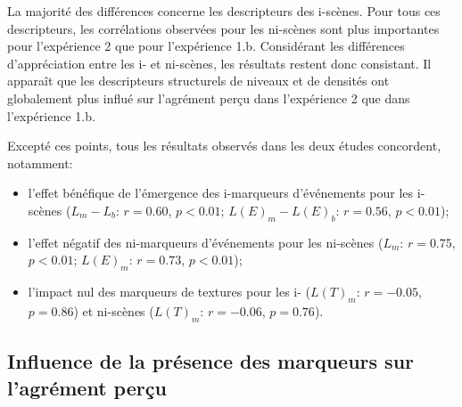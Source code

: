 La majorité des différences concerne les descripteurs des i-scènes. Pour tous ces descripteurs, les corrélations observées pour les ni-scènes sont plus importantes pour l'expérience 2 que pour l'expérience 1.b. Considérant les différences d'appréciation entre les i- et ni-scènes, les résultats restent donc consistant. Il apparaît que les descripteurs structurels de niveaux et de densités ont globalement plus influé sur l'agrément perçu dans l'expérience 2 que dans l'expérience 1.b.

Excepté ces points, tous les résultats observés dans les deux études concordent, notamment:

\begin{itemize}
\item l'effet bénéfique de l'émergence des i-marqueurs d'événements pour les i-scènes ($L_m-L_b$: $r=0.60$, $p<0.01$; $L(E)_m-L(E)_b$: $r=0.56$, $p<0.01$);
\item l'effet négatif des ni-marqueurs d'événements pour les ni-scènes ($L_m$: $r=0.75$, $p<0.01$; $L(E)_m$: $r=0.73$, $p<0.01$);
\item l'impact nul des marqueurs de textures pour les i- ($L(T)_m$: $r=-0.05$, $p=0.86$) et ni-scènes ($L(T)_m$: $r=-0.06$, $p=0.76$).
\end{itemize}


\subsection{Influence de la présence des marqueurs sur l'agrément perçu}
\label{sec:ch5_Asujet}

